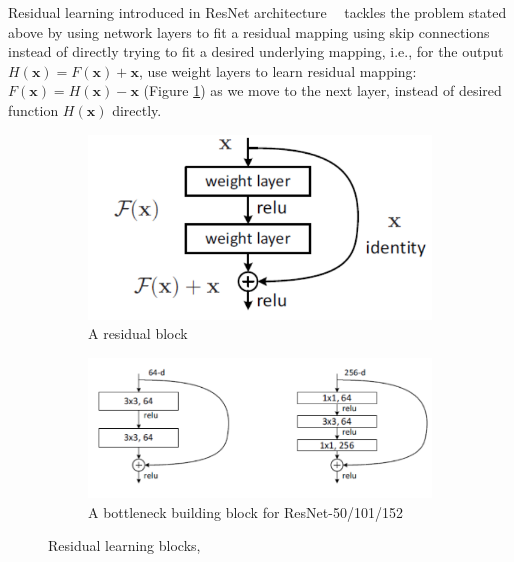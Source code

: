 \documentclass[12pt]{report}
\numberwithin{equation}{section}
\begin{document}
Residual learning introduced in ResNet architecture \textbf{~\cite{He2015DeepRL}} tackles the problem stated above by using network layers to fit a residual mapping using skip connections instead of directly trying to fit a desired underlying mapping, i.e., for the output $H(\bm{x})= F(\bm{x}) + \bm{x}$, use weight layers to learn residual mapping: $F(\bm{x}) = H(\bm{x})-\bm{x}$ (Figure \ref{subfig:residual_block}) as we move to the next layer, instead of desired function $H(\bm{x})$ directly.
\begin{figure}[H]
\centering
	\begin{subfigure}[t]{\textwidth}
	\centering
	\includegraphics[scale=0.7]{png/residual_block.png}
 	\caption{A residual block}	 
	\label{subfig:residual_block}
	\end{subfigure}
	
	\medskip
	
	\begin{subfigure}[t]{\textwidth}
	\centering
	\includegraphics[scale=0.7]{png/bottleneck.png}		
	\caption{A bottleneck building block for ResNet-50/101/152}	 
	\label{subfig:bottleneck}
	\end{subfigure}
\caption[Residual learning blocks]{Residual learning blocks, \protect\textbf{\cite{He2015DeepRL}}}	 
\label{fig:residual_learning}
\end{figure} \noindent
\end{document}
